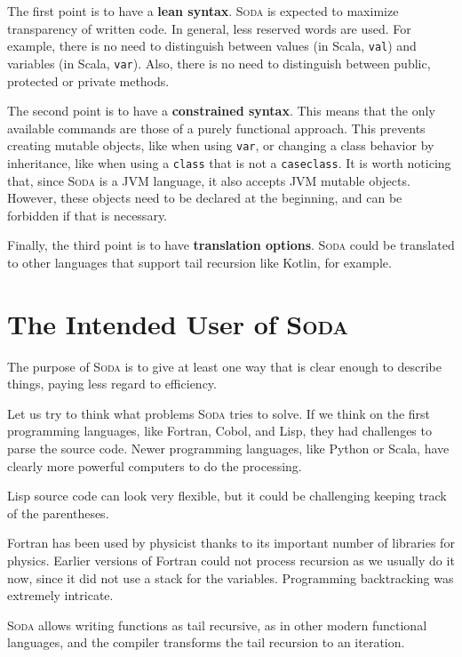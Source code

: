 \documentclass[12pt,a4paper]{book}
\newcommand{\srccode}[1]{\texttt{{#1}}}
\newcommand{\reservedWord}[1]{{\color{blue}\srccode{#1}}\xspace}
\newcommand{\scalacase}{\reservedWord{case}}
\newcommand{\scalaclass}{\reservedWord{class}}
\newcommand{\scalaval}{\reservedWord{val}}
\newcommand{\scalavar}{\reservedWord{var}}
\newcommand{\Soda}{\textsc{Soda}\xspace}
\begin{document}
    The first point is to have a \textbf{lean syntax}.
    \Soda is expected to maximize transparency of written code.
    In general, less reserved words are used.
    For example, there is no need to distinguish between values (in Scala, \scalaval) and variables (in Scala, \scalavar).
    Also, there is no need to distinguish between public, protected or private methods.

    The second point is to have a \textbf{constrained syntax}.
    This means that the only available commands are those of a purely functional approach.
    This prevents creating mutable objects, like when using \scalavar, or changing a class behavior by inheritance, like when using a \scalaclass that is not a \scalacase \scalaclass.
    It is worth noticing that, since \Soda is a JVM language, it also accepts JVM mutable objects.
    However, these objects need to be declared at the beginning, and can be forbidden if that is necessary.

    Finally, the third point is to have \textbf{translation options}.
    \Soda could be translated to other languages that support tail recursion like Kotlin, for example.


    \section{The Intended User of \Soda}

    The purpose of \Soda is to give at least one way that is clear enough to describe things, paying less regard to efficiency.

    Let us try to think what problems \Soda tries to solve.
    If we think on the first programming languages, like Fortran, Cobol, and Lisp, they had challenges to parse the source code.
    Newer programming languages, like Python or Scala, have clearly more powerful computers to do the processing.

    Lisp source code can look very flexible, but it could be challenging keeping track of the parentheses.

    Fortran has been used by physicist thanks to its important number of libraries for physics.
    Earlier versions of Fortran could not process recursion as we usually do it now, since it did not use a stack for the variables.
    Programming backtracking was extremely intricate.

    \Soda allows writing functions as tail recursive, as in other modern functional languages, and the compiler transforms the tail recursion to an iteration.
\end{document}
